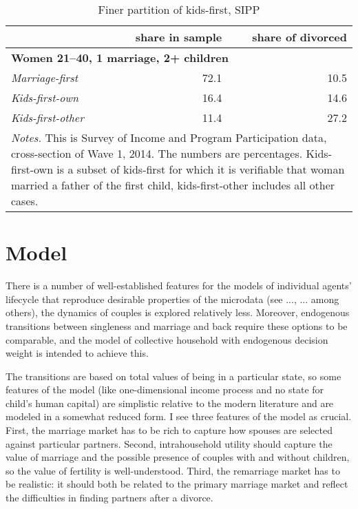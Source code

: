 \documentclass[12pt,letter]{article}
\begin{document}
\begin{table}[h!]
\caption{Finer partition of kids-first, SIPP\label{fine_table}}
\begin{center}
\begin{tabular}{l r r}
\hline
& share in sample & share of divorced  \\\hline
\multicolumn{3}{l}{\textbf{Women 21--40, 1 marriage, 2+ children}} \\\hline
\textit{Marriage-first} & 72.1 & 10.5 \\
\textit{Kids-first-own} &  16.4 & 14.6 \\
\textit{Kids-first-other} &  11.4 & 27.2 \\\hline
\multicolumn{3}{p{0.6\linewidth}}{ \footnotesize \textit{Notes.} This is Survey of Income and Program Participation data, cross-section of Wave 1, 2014. The numbers are percentages. Kids-first-own is a subset of kids-first for which it is verifiable that woman married a father of the first child, kids-first-other includes all other cases.} \\\hline
\end{tabular}
\end{center}
\end{table}


\section{Model}
There is a number of well-established features for the models of individual agents' lifecycle that reproduce desirable properties of the microdata (see ..., ... among others), the dynamics of couples is explored relatively less. Moreover, endogenous transitions between singleness and marriage and back require these options to be comparable, and the model of collective household with endogenous decision weight is intended to achieve this. 

The transitions are based on total values of being in a particular state, so some features of the model (like one-dimensional income process and no state for child's human capital) are simplistic relative to the modern literature and are modeled in a somewhat reduced form. I see three features of the model as crucial. First, the marriage market has to be rich to capture how spouses are selected against particular partners. Second, intrahousehold utility should capture the value of marriage and the possible presence of couples with and without children, so the value of fertility is well-understood. Third, the remarriage market has to be realistic: it should both be related to the primary marriage market and reflect the difficulties in finding partners after a divorce.
\end{document}
